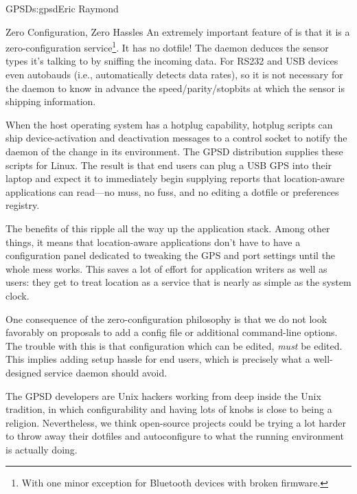 \begin{aosachapter}{GPSD}{s:gpsd}{Eric Raymond}
\begin{aosasect1}{Zero Configuration, Zero Hassles}
An extremely important feature of  is that it is a
zero-configuration service\footnote{With one minor exception for
Bluetooth devices with broken firmware.}.  It has no dotfile!  The
daemon deduces the sensor types it's talking to by sniffing the
incoming data.  For RS232 and USB devices  even autobauds
(i.e., automatically detects data rates), so it is not necessary for
the daemon to know in advance the speed/parity/stopbits at which the
sensor is shipping information.


When the host operating system has a hotplug capability, hotplug
scripts can ship device-activation and deactivation messages to a
control socket to notify the daemon of the change in its environment.
The GPSD distribution supplies these scripts for Linux.  The result
is that end users can plug a USB GPS into their laptop and expect
it to immediately begin supplying reports that location-aware
applications can read---no muss, no fuss, and no editing a 
dotfile or preferences registry.

The benefits of this ripple all the way up the application stack.
Among other things, it means that location-aware applications don't
have to have a configuration panel dedicated to tweaking the GPS and
port settings until the whole mess works. This saves a lot of effort
for application writers as well as users: they get to treat location
as a service that is nearly as simple as the system clock.

One consequence of the zero-configuration philosophy is that we do not
look favorably on proposals to add a config file or additional
command-line options.  The trouble with this is that configuration
which can be edited, \emph{must} be edited.  This implies adding setup
hassle for end users, which is precisely what a well-designed service
daemon should avoid.


The GPSD developers are Unix hackers working from deep inside the
Unix tradition, in which configurability and having lots of knobs
is close to being a religion.  Nevertheless, we think open-source
projects could be trying a lot harder to throw away their dotfiles
and autoconfigure to what the running environment is actually doing.


\end{aosasect1}
\end{aosachapter}
